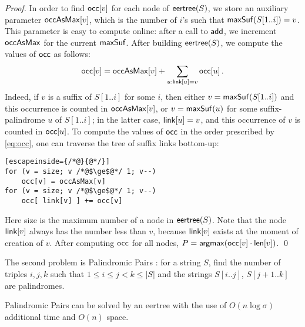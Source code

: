 \documentclass{llncs}
\def\add{{\sf add}}
\def\eertree{{\sf eertree}}
\def\maxsuf{{\sf maxSuf}}
\def\len{{\sf len}}
\def\link{{\sf link}}
\def\occ{{\sf occ}}
\def\occas{{\sf occAsMax}}
\def\argmax{{\sf argmax}}
\begin{document}
\begin{proof}
In order to find $\occ[v]$ for each node of $\eertree(S)$, we store an auxiliary parameter $\occas[v]$, which is the number of $i$'s such that $\maxsuf(S[1..i])=v$. This parameter is easy to compute online: after a call to $\add$, we increment $\occas$ for the current $\maxsuf$. After building $\eertree(S)$, we compute the values of $\occ$ as follows:
\begin{equation} \label{eq:occ}
\occ[v]=\occas[v]+\sum_{u: \link[u]=v} \occ[u]\,.
\end{equation}
Indeed, if $v$ is a suffix of $S[1..i]$ for some $i$, then either $v=\maxsuf(S[1..i])$ and this occurrence is counted in $\occas[v]$, or $v=\maxsuf(u)$ for some suffix-palindrome $u$ of $S[1..i]$; in the latter case, $\link[u]=v$, and this occurrence of $v$ is counted in $\occ[u]$.  To compute the values of $\occ$ in the order prescribed by \eqref{eq:occ}, one can traverse the tree of suffix links bottom-up:

\lstset{frame=tb,
  language=Pascal,
  aboveskip=3mm,
  belowskip=3mm,
  showstringspaces=false,
  columns=flexible,
  basicstyle=\ttfamily,
  numbers=none,
  keywordstyle=\bf,
  breaklines=true,
  breakatwhitespace=true
  tabsize=3
}

\begin{lstlisting}[escapeinside={/*@}{@*/}]
for (v = size; v /*@$\ge$@*/ 1; v--)
	occ[v] = occAsMax[v]
for (v = size; v /*@$\ge$@*/ 1; v--)
	occ[ link[v] ] += occ[v]
\end{lstlisting}

Here {\sf size} is the maximum number of a node in $\eertree(S)$. Note that the node $\link[v]$ always has the number less than $v$, because $\link[v]$ exists at the moment of creation of $v$.
After computing $\occ$ for all nodes, $P = \argmax(\occ[v] \cdot \len[v])$. \qed
\end{proof}

The second problem is {\sf Palindromic Pairs} \cite[Problem B]{PPair}: for a string $S$, find the number of triples $i, j, k$ such that $1 \le i \le j < k \le |S|$ and the strings $S[i..j]$, $S[j {+} 1..k]$ are palindromes.

\begin{proposition}
{\sf Palindromic Pairs} can be solved by an eertree with the use of $O(n\log\sigma)$ additional time and $O(n)$ space.
\end{proposition}
\end{document}
